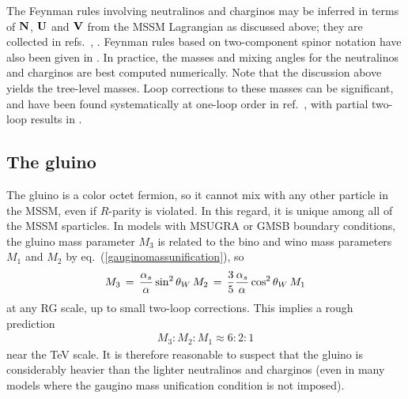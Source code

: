 \documentclass[12pt]{article}
\def\beq{\begin{eqnarray}}
\def\eeq{\end{eqnarray}}
\begin{document}
The Feynman rules involving neutralinos and charginos may be inferred in 
terms of $\bf N$, $\bf U$ and $\bf V$ from the MSSM Lagrangian as 
discussed above; they are collected in 
refs.~\cite{HaberKanereview}, \cite{GunionHaber}. 
Feynman rules 
based on two-component spinor notation have also  been given in 
\cite{DHM}.
In practice, the masses and mixing angles for the 
neutralinos and charginos are best computed numerically. Note that the 
discussion above yields the tree-level masses. Loop corrections to these 
masses can be significant, and have been found systematically at one-loop 
order in ref.~\cite{PBMZ}, with partial two-loop results in
\cite{GNCpoletwo,NCpole}.

\subsection{The gluino\label{subsec:MSSMspectrum.gluino}}
\setcounter{equation}{0}
\setcounter{footnote}{1}

The gluino is a color octet fermion, so it cannot mix with any other 
particle in the MSSM, even if $R$-parity is violated. In this regard, it 
is unique among all of the MSSM sparticles. In models with MSUGRA 
or GMSB boundary conditions, 
the gluino mass 
parameter $M_3$ is related to the bino and wino mass parameters $M_1$ and 
$M_2$ by eq.~(\ref{gauginomassunification}), so
\beq
M_3 \,=\, {\alpha_s\over \alpha} \sin^2\theta_W\, 
M_2 \,=\, {3\over 5} {\alpha_s \over \alpha} \cos^2\theta_W\, M_1
\label{eq:TiaEla}
\eeq
at any RG scale, up to small two-loop corrections. This implies a rough 
prediction
\beq
M_3 : M_2 : M_1 \approx 6:2:1
\eeq
near the TeV scale. It is therefore
reasonable to suspect that the gluino 
is considerably heavier than the lighter neutralinos and charginos
(even in many models where the gaugino mass unification condition is not
imposed).
\end{document}
